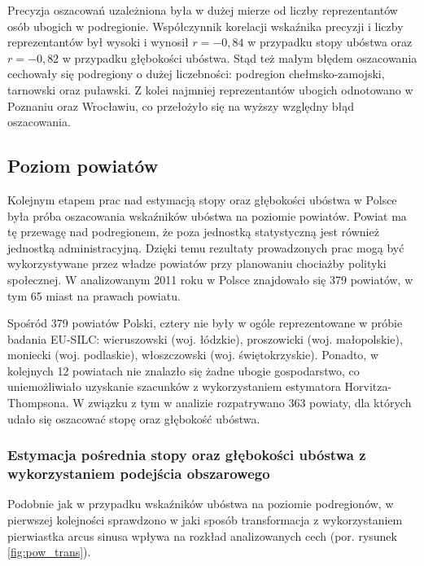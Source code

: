 Precyzja oszacowań uzależniona była w dużej mierze od liczby reprezentantów osób ubogich w podregionie. Współczynnik korelacji wskaźnika precyzji i liczby reprezentantów był wysoki i wynosił $r=-0,84$ w przypadku stopy ubóstwa oraz $r=-0,82$ w przypadku głębokości ubóstwa. Stąd też małym błędem oszacowania cechowały się podregiony o dużej liczebności: podregion chełmsko-zamojski, tarnowski oraz puławski. Z kolei najmniej reprezentantów ubogich odnotowano w Poznaniu oraz Wrocławiu, co przełożyło się na wyższy względny błąd oszacowania.

\subsection{Poziom powiatów}

Kolejnym etapem prac nad estymacją stopy oraz głębokości ubóstwa w Polsce była próba oszacowania wskaźników ubóstwa na poziomie powiatów. Powiat ma tę przewagę nad podregionem, że poza jednostką statystyczną jest również jednostką administracyjną. Dzięki temu rezultaty prowadzonych prac mogą być wykorzystywane przez władze powiatów przy planowaniu chociażby polityki społecznej. W analizowanym 2011 roku w Polsce znajdowało się 379 powiatów, w tym 65 miast na prawach powiatu.

Spośród 379 powiatów Polski, cztery nie były w ogóle reprezentowane w próbie badania EU-SILC: wieruszowski (woj. łódzkie), proszowicki (woj. małopolskie), moniecki (woj. podlaskie), włoszczowski (woj. świętokrzyskie). Ponadto, w kolejnych 12 powiatach nie znalazło się żadne ubogie gospodarstwo, co uniemożliwiało uzyskanie szacunków z wykorzystaniem estymatora Horvitza-Thompsona. W związku z tym w analizie rozpatrywano 363 powiaty, dla których udało się oszacować stopę oraz głębokość ubóstwa.

\subsubsection{Estymacja pośrednia stopy oraz głębokości ubóstwa z wykorzystaniem podejścia obszarowego}

Podobnie jak w przypadku wskaźników ubóstwa na poziomie podregionów, w pierwszej kolejności sprawdzono w jaki sposób transformacja z wykorzystaniem pierwiastka arcus sinusa wpływa na rozkład analizowanych cech (por. rysunek \ref{fig:pow_trans}).

